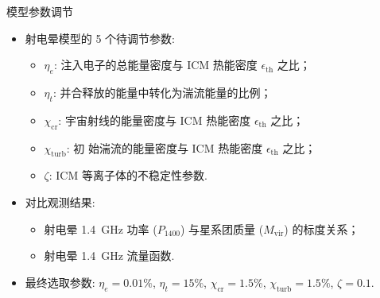 \documentclass{beamer}
\newcommand{\R}[1]{\text{#1}}  %
\begin{document}
\begin{frame}{模型参数调节}
  \begin{itemize}
    \item 射电晕模型的 5 个待调节参数:
      \begin{itemize}
        \item $\eta_e$:
          注入电子的总能量密度与 ICM 热能密度 $\epsilon_{\R{th}}$ 之比；
        \item $\eta_t$:
          并合释放的能量中转化为湍流能量的比例；
        \item $\chi_{\R{cr}}$:
          宇宙射线的能量密度与 ICM 热能密度 $\epsilon_{\R{th}}$ 之比；
        \item $\chi_{\R{turb}}$:
          初  始湍流的能量密度与 ICM 热能密度 $\epsilon_{\R{th}}$ 之比；
        \item $\zeta$:
          ICM 等离子体的不稳定性参数.
      \end{itemize}
    \item 对比观测结果:
      \begin{itemize}
        \item 射电晕 \SI{1.4}{\GHz} 功率 ($P_{1400}$)
          与星系团质量 ($M_{\R{vir}}$) 的标度关系；
        \item 射电晕 \SI{1.4}{\GHz} 流量函数.
      \end{itemize}
    \item 最终选取参数:
      $\eta_e = 0.01\%$,
      $\eta_t = 15\%$,
      $\chi_{\R{cr}} = 1.5\%$,
      $\chi_{\R{turb}} = 1.5\%$,
      $\zeta = 0.1$.
  \end{itemize}
\end{frame}
\end{document}
